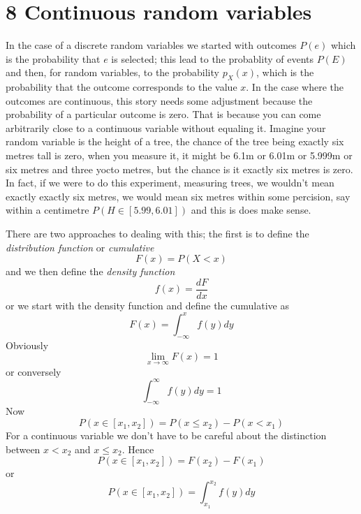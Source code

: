 \documentclass[11pt,a4paper]{scrartcl}
\begin{document}
\section*{8 Continuous random variables}

In the case of a discrete random variables we started with outcomes
$P(e)$ which is the probability that $e$ is selected; this lead to the
probablity of events $P(E)$ and then, for random variables, to the
probability $p_X(x)$, which is the probability that the outcome
corresponds to the value $x$. In the case where the outcomes are
continuous, this story needs some adjustment because the probability
of a particular outcome is zero. That is because you can come
arbitrarily close to a continuous variable without equaling
it. Imagine your random variable is the height of a tree, the chance
of the tree being exactly six metres tall is zero, when you measure
it, it might be 6.1m or 6.01m or 5.999m or six metres and three yocto
metres, but the chance is it exactly six metres is zero. In fact, if
we were to do this experiment, measuring trees, we wouldn't mean
exactly exactly six metres, we would mean six metres within some
percision, say within a centimetre $P(H\in [5.99,6.01])$ and this is
does make sense.

There are two approaches to dealing with this; the first is to define
the \textsl{distribution function} or \textsl{cumulative}
\begin{equation}
F(x)=P(X<x)
\end{equation}
and we then define the \textsl{density function}
\begin{equation}
f(x)=\frac{dF}{dx}
\end{equation}
or we start with the density function and define the cumulative as
\begin{equation}
F(x)=\int_{-\infty}^x f(y)dy
\end{equation}
Obviously 
\begin{equation}
\lim_{x\rightarrow \infty}F(x)=1
\end{equation}
or conversely 
\begin{equation}
\int_{-\infty}^\infty f(y)dy=1
\end{equation}
Now
\begin{equation}
P(x\in [x_1,x_2])=P(x\le x_2)-P(x<x_1)
\end{equation}
For a continuous variable we don't have to be careful about the
distinction between $x<x_2$ and $x\le x_2$. Hence
\begin{equation}
P(x\in [x_1,x_2])=F(x_2)-F(x_1)
\end{equation}
or
\begin{equation}
P(x\in [x_1,x_2])=\int_{x_1}^{x_2} f(y)dy
\end{equation}
\end{document}
